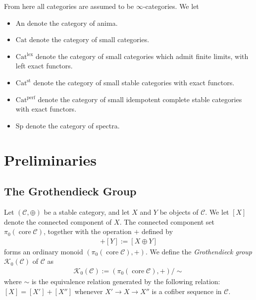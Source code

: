\documentclass[a4paper,dvipdfmx,11pt,reqno]{amsart}
\DeclareMathOperator{\core}{core}
\newcommand{\C}{\mathcal{C}}
\newcommand{\K}{\mathcal{K}}
\newcommand{\An}{\mathrm{An}}
\newcommand{\Cat}{\mathrm{Cat}}
\newcommand{\Catlex}{\mathrm{Cat^{lex}}}
\newcommand{\Catperf}{\mathrm{Cat^{perf}}}
\newcommand{\Catst}{\mathrm{Cat^{st}}}
\newcommand{\Sp}{\mathrm{Sp}}
\begin{document}
From here all categories are assumed to be $\infty$-categories.
We let 
\begin{itemize}
  \item $\An$ denote the category of anima.
  \item $\Cat$ denote the category of small categories.
  \item $\Catlex$ denote the category of small categories which admit finite limits, with left exact functors.
  \item $\Catst$ denote the category of small stable categories with exact functors.
  \item $\Catperf$ denote the category of small idempotent complete stable categories with exact functors.
  \item $\Sp$ denote the category of spectra.
\end{itemize}


\section{Preliminaries}

\subsection{The Grothendieck Group} %

\begin{definition}
  Let $(\C,\oplus)$ be a stable category, and let $X$ and $Y$ be objects of $\C$.
  We let $[X]$ denote the connected component of $X$.
  The connected component set $\pi_0(\core\C)$, together with the operation $+$ defined by 
  \begin{align*}
    [X] + [Y] := [X \oplus Y]
  \end{align*}
  forms an ordinary monoid $(\pi_0(\core\C),+)$.
  We define the \textit{Grothendieck group} $\K_0(\C)$ of $\C$ as 
  \begin{align*}
    \K_0(\C) := (\pi_0(\core\C),+) / \sim
  \end{align*}
  where $\sim$ is the equivalence relation generated by the following relation:
  $[X]=[X']+[X'']$ whenever $X' \to X \to X''$ is a cofiber sequence in $\C$.
\end{definition}
\end{document}
